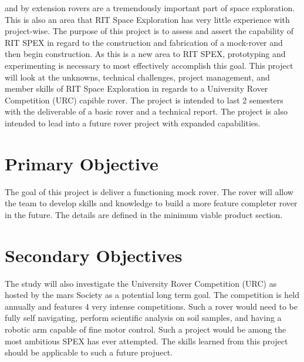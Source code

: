 \documentclass[conference]{IEEEtran} %
\begin{document}
 and by extension rovers are a tremendously important part of space exploration. 
This is also an area that RIT Space Exploration has very little experience with project-wise. 
The purpose of this project is to assess and assert the capability of RIT SPEX in regard to the construction and fabrication of a mock-rover and then begin construction. 
As this is a new area to RIT SPEX, prototyping and experimenting is necessary to most effectively accomplish this goal. 
This project will look at the unknowns, technical challenges, project management, and member skills of RIT Space Exploration in regards to a University Rover Competition (URC) capible rover.
The project is intended to last 2 semesters with the deliverable of a basic rover and a technical report. 
The project is also intended to lead into a future rover project with expanded capabilities.

\section{Primary Objective}
\label{sec:primary-obj}

The goal of this project is deliver a functioning mock rover. The rover will allow the team to develop skills and knowledge to build a more feature completer rover in the future. The details are defined in the minimum viable product section. 


\section{Secondary Objectives}
\label{sec:secondary-obj}
The study will also investigate the University Rover Competition (URC) as hosted by the mars Society as a potential long term goal. The competition is held annually and features 4 very intense competitions. Such a rover would need to be fully self navigating, perform scientific analysis on soil samples, and having a robotic arm capable of fine motor control. Such a project would be among the most ambitious SPEX has ever attempted. The skills learned from this project should be applicable to such a future projuect. 
\end{document}
